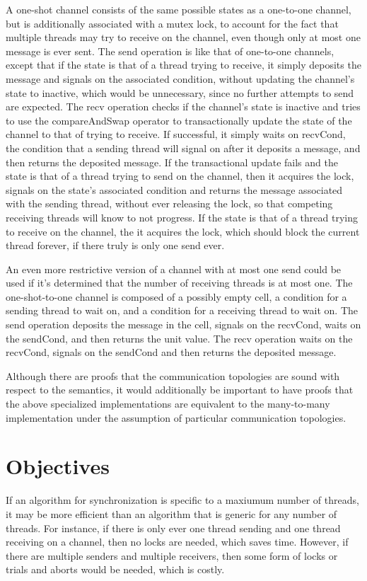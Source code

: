 \documentclass{article}
\begin{document}
A one-shot channel consists of the same possible states as a one-to-one channel, but is additionally associated with a mutex lock, to account for the fact that multiple threads may try to receive on the channel, even though only at most one message is ever sent.
	The send operation is like that of one-to-one channels, except that if the state is that of a thread trying to receive, it simply deposits the message and signals on the associated condition, without updating the channel's state to inactive, which would be unnecessary, since no further attempts to send are expected.
	The recv operation checks if the channel's state is inactive and tries to use the compareAndSwap operator to transactionally update the state of the channel to that of trying to receive.  If successful, it simply waits on recvCond, the condition that a sending thread will signal on after it deposits a message, and then returns the deposited message.  If the transactional update fails and the state is that of a thread trying to send on the channel, then it acquires the lock, signals on the state's associated condition and returns the message associated with the sending thread, without ever releasing the lock, so that competing receiving threads will know to not progress.  If the state is that of a thread trying to receive on the channel, the it acquires the lock, which should block the current thread forever, if there truly is only one send ever.

An even more restrictive version of a channel with at most one send could be used if it's determined that the number of receiving threads is at most one.  The one-shot-to-one channel is composed of a possibly empty cell, a condition for a sending thread to wait on, and a condition for a receiving thread to wait on.
	The send operation deposits the message in the cell, signals on the recvCond, waits on the sendCond, and then returns the unit value.  The recv operation waits on the recvCond, signals on the sendCond and then returns the deposited message.

	Although there are proofs that the communication topologies are sound with respect to the semantics, it would additionally be important to have proofs that the above specialized implementations are equivalent to the many-to-many implementation under the assumption of particular communication topologies.


\section{Objectives}
If an algorithm for synchronization is specific to a maxiumum number of threads, it may be more efficient than an algorithm that is generic for any number of threads.  For instance, if there is only ever one thread sending and one thread receiving on a channel, then no locks are needed, which saves time.  However, if there are multiple senders and multiple receivers, then some form of locks or trials and aborts would be needed, which is costly.
\end{document}
